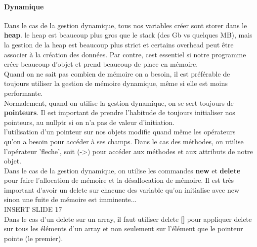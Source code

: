 \documentclass[oneside]{book}
\begin{document}
\paragraph{Dynamique}
Dans le cas de la gestion dynamique, tous nos variables créer sont storer dans le \textbf{heap}. le heap est beaucoup plus gros que le stack (des Gb vs quelques MB), mais la gestion de la heap est beaucoup plus strict et certains overhead peut être associer à la création des données. Par contre, cest essentiel si notre programme créer beaucoup d'objet et prend beaucoup de place en mémoire. \\

Quand on ne sait pas combien de mémoire on a besoin, il est préférable de toujours utiliser la gestion de mémoire dynamique, même si elle est moins performante.\\

Normalement, quand on utilise la gestion dynamique, on se sert toujours de \textbf{pointeurs}. Il est important de prendre l'habitude de toujours initialiser nos pointeurs, au nullptr si on n'a pas de valeur d'initiation. \\

l'utilisation d'un pointeur sur nos objets modifie quand même les opérateurs qu'on a besoin pour accéder à ses champs. Dans le cas des méthodes, on utilise l'opérateur 'fleche', soit (->) pour accéder aux méthodes et aux attributs de notre objet.\\

Dans le cas de la gestion dynamique, on utilise les commandes \textbf{new} et \textbf{delete} pour faire l'allocation de mémoire et la désallocation de mémoire. Il est très important d'avoir un delete sur chacune des variable qu'on initialise avec new sinon une fuite de mémoire est imminente...\\

INSERT SLIDE 17\\

Dans le cas d'un delete sur un array, il faut utiliser delete [] pour appliquer delete sur tous les éléments d'un array et non seulement sur l'élément que le pointeur pointe (le premier). \\
\end{document}
